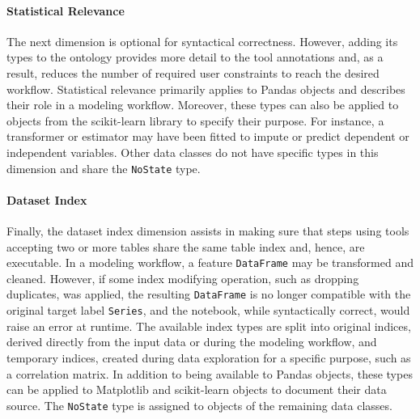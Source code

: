\paragraph{Statistical Relevance}
The next dimension is optional for syntactical correctness. However, adding its types to the ontology provides more detail to the tool annotations and, as a result, reduces the number of required user constraints to reach the desired workflow. Statistical relevance primarily applies to Pandas objects and describes their role in a modeling workflow. Moreover, these types can also be applied to objects from the scikit-learn library to specify their purpose. For instance, a transformer or estimator may have been fitted to impute or predict dependent or independent variables. Other data classes do not have specific types in this dimension and share the \verb|NoState| type.

\paragraph{Dataset Index}
Finally, the dataset index dimension assists in making sure that steps using tools accepting two or more tables share the same table index and, hence, are executable. In a modeling workflow, a feature \texttt{DataFrame} may be transformed and cleaned. However, if some index modifying operation, such as dropping duplicates, was applied, the resulting \texttt{DataFrame} is no longer compatible with the original target label \texttt{Series}, and the notebook, while syntactically correct, would raise an error at runtime. The available index types are split into original indices, derived directly from the input data or during the modeling workflow, and temporary indices, created during data exploration for a specific purpose, such as a correlation matrix. In addition to being available to Pandas objects, these types can be applied to Matplotlib and scikit-learn objects to document their data source. The \verb|NoState| type is assigned to objects of the remaining data classes.

